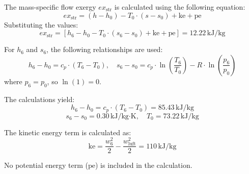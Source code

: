 The mass-specific flow exergy \( ex_{\text{str}} \) is calculated using the following equation:  
\[
ex_{\text{str}} = (h - h_0) - T_0 \cdot (s - s_0) + \text{ke} + \text{pe}
\]  
Substituting the values:  
\[
ex_{\text{str}} = [h_6 - h_0 - T_0 \cdot (s_6 - s_0) + \text{ke} + \text{pe}] = 12.22 \, \text{kJ/kg}
\]  

For \( h_6 \) and \( s_6 \), the following relationships are used:  
\[
h_6 - h_0 = c_p \cdot (T_6 - T_0), \quad s_6 - s_0 = c_p \cdot \ln\left(\frac{T_6}{T_0}\right) - R \cdot \ln\left(\frac{p_6}{p_0}\right)
\]  
where \( p_6 = p_0 \), so \( \ln(1) = 0 \).  

The calculations yield:  
\[
h_6 - h_0 = c_p \cdot (T_6 - T_0) = 85.43 \, \text{kJ/kg}
\]  
\[
s_6 - s_0 = 0.30 \, \text{kJ/kg·K}, \quad T_0 = 73.22 \, \text{kJ/kg}
\]  

The kinetic energy term is calculated as:  
\[
\text{ke} = \frac{w_6^2}{2} - \frac{w_{\text{luft}}^2}{2} = 110 \, \text{kJ/kg}
\]  

No potential energy term (\( \text{pe} \)) is included in the calculation.